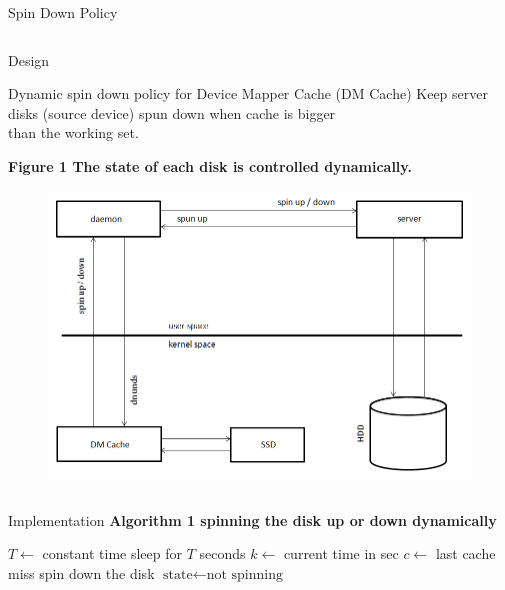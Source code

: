 \documentclass[final]{beamer}
\newlength{\onecolwid}
\newlength{\twocolwid}
\begin{document}
\begin{frame}[t]
\begin{columns}[t]
\begin{column}{\twocolwid}
\begin{alertblock}{Spin Down Policy}
		\begin{column}{\onecolwid}
		    \begin{block}{Design}
			\raggedright Dynamic spin down policy for Device Mapper Cache (DM Cache)
			    Keep server disks (source device) spun down when cache is bigger \\
			    than the working set. \\
			\vspace{15pt}
			\raggedright \bf Figure 1 \rm The state of each disk is controlled dynamically.
			\vspace{15pt}
			\begin{figure}
			    \centering \includegraphics{drawing.png}
			    \label{fig:struct}
			\end{figure}
		    \end{block}
		\end{column}
		\begin{column}{\onecolwid}
		    \begin{block}{Implementation}
			\bf Algorithm 1 \rm spinning the disk up or down dynamically \\
			\algrenewcommand{}
			\begin{algorithmic}[1]
			    \State $T\gets$ constant time
				    \State sleep for $T$ seconds
					\State $k\gets$ current time in sec
					\State $c\gets$ last cache miss
					    \State spin down the disk
					    \State $\text{state}\gets \text{not spinning}$
					\EndIf
				    \Else {}

\end{algorithmic}
\end{block}
\end{column}
\end{alertblock}
\end{column}
\end{columns}
\end{frame}
\end{document}
